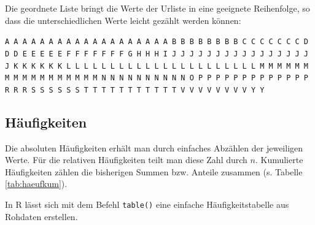 \documentclass[
  11pt,
  ngerman,
  a4paper,
]{report}
\newenvironment{rtip}{
  \medskip
  \begin{tcolorbox}[colframe=purple,colback=light_gray,title=Softwarehinweis]
}{
  \end{tcolorbox}
  \medskip
}
\begin{document}
Die geordnete Liste bringt die Werte der Urliste in eine geeignete Reihenfolge, so dass die unterschiedlichen Werte leicht gezählt werden können:

\texttt{A\ A\ A\ A\ A\ A\ A\ A\ A\ A\ A\ A\ A\ A\ A\ A\ A\ A\ A\ B\ B\ B\ B\ B\ B\ B\ B\ C\ C\ C\ C\ C\ C\ C\ D\ D\ D\ E\ E\ E\ E\ E\ F\ F\ F\ F\ F\ F\ F\ G\ H\ H\ H\ I\ J\ J\ J\ J\ J\ J\ J\ J\ J\ J\ J\ J\ J\ J\ J\ J\ J\ K\ K\ K\ K\ K\ K\ L\ L\ L\ L\ L\ L\ L\ L\ L\ L\ L\ L\ L\ L\ L\ L\ L\ L\ L\ L\ L\ L\ M\ M\ M\ M\ M\ M\ M\ M\ M\ M\ M\ M\ M\ M\ M\ M\ M\ N\ N\ N\ N\ N\ N\ N\ N\ N\ N\ O\ P\ P\ P\ P\ P\ P\ P\ P\ P\ P\ P\ P\ P\ R\ R\ R\ S\ S\ S\ S\ S\ S\ T\ T\ T\ T\ T\ T\ T\ T\ T\ T\ T\ V\ V\ V\ V\ V\ V\ V\ V\ Y\ Y}

\hypertarget{huxe4ufigkeiten}{%
\subsection{Häufigkeiten}\label{huxe4ufigkeiten}}

Die absoluten Häufigkeiten erhält man durch einfaches Abzählen der jeweiligen Werte. Für die relativen Häufigkeiten teilt man diese Zahl durch \(n\). Kumulierte Häufigkeiten zählen die bisherigen Summen bzw. Anteile zusammen (s. Tabelle \ref{tab:haeufkum}).

\begin{rtip}
In R lässt sich mit dem Befehl \verb|table()| eine einfache Häufigkeitstabelle aus Rohdaten erstellen.
\end{rtip}
\end{document}
